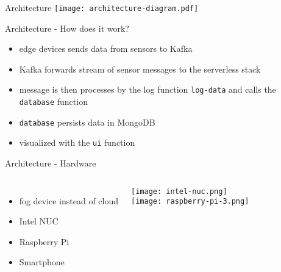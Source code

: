 \begin{frame}{Architecture}
  \centering
  \vfill
  \texttt{[image: architecture-diagram.pdf]}
\end{frame}

\begin{frame}{Architecture - How does it work?}
  \begin{itemize}
    \item edge devices sends data from sensors to Kafka
    \item Kafka forwards stream of sensor messages to the serverless stack
    \item message is then processes by the log function \lstinline{log-data} and calls the \lstinline{database} function
    \item \lstinline{database} persists data in MongoDB
    \item visualized with the \lstinline{ui} function
  \end{itemize}
\end{frame}

\begin{frame}{Architecture - Hardware}
  \begin{columns}
    \begin{itemize}
      \item fog device instead of cloud
      \item Intel NUC
      \item Raspberry Pi
      \item Smartphone
    \end{itemize}

    \centering
    \vfill
    \vspace*{2em}
    \texttt{[image: intel-nuc.png]}
    \\
    \vspace*{1.5em}
    \texttt{[image: raspberry-pi-3.png]}
  \end{columns}
\end{frame}

